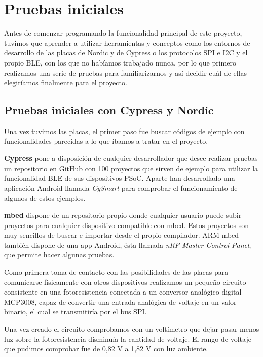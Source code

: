 
\cleardoublepage

\chapter{Pruebas iniciales}
\label{makereference4}

Antes de comenzar programando la funcionalidad principal de este proyecto, tuvimos que aprender a utilizar herramientas y conceptos como los entornos de desarrollo de las placas de Nordic y de Cypress o los protocolos SPI e I2C y el propio BLE, con los que no habíamos trabajado nunca, por lo que primero realizamos una serie de pruebas para familiarizarnos y así decidir cuál de ellas elegiríamos finalmente para el proyecto.

\section{Pruebas iniciales con Cypress y Nordic}
\label{makereference4.1}

Una vez tuvimos las placas, el primer paso fue buscar códigos de ejemplo con funcionalidades parecidas a lo que íbamos a tratar en el proyecto.

\textbf{Cypress} pone a disposición de cualquier desarrollador que desee realizar pruebas un repositorio en GitHub con 100 proyectos que sirven de ejemplo para utilizar la funcionalidad BLE de sus dispositivos PSoC. Aparte han desarrollado una aplicación Android llamada \textit{CySmart} para comprobar el funcionamiento de algunos de estos ejemplos.

\textbf{mbed} dispone de un repositorio propio donde cualquier usuario puede subir proyectos para cualquier dispositivo compatible con mbed. Estos proyectos son muy sencillos de buscar e importar desde el propio compilador. ARM mbed también dispone de una app Android, ésta llamada \textit{nRF Master Control Panel}, que permite hacer algunas pruebas.

Como primera toma de contacto con las posibilidades de las placas para comunicarse físicamente con otros dispositivos realizamos un pequeño circuito consistente en una fotoresistencia conectada a un conversor analógico-digital MCP3008, capaz de convertir una entrada analógica de voltaje en un valor binario, el cual se transmitiría por el bus SPI.

Una vez creado el circuito comprobamos con un voltímetro que dejar pasar menos luz sobre la fotoresistencia disminuía la cantidad de voltaje. El rango de voltaje que pudimos comprobar fue de 0,82 V a 1,82 V con luz ambiente.

